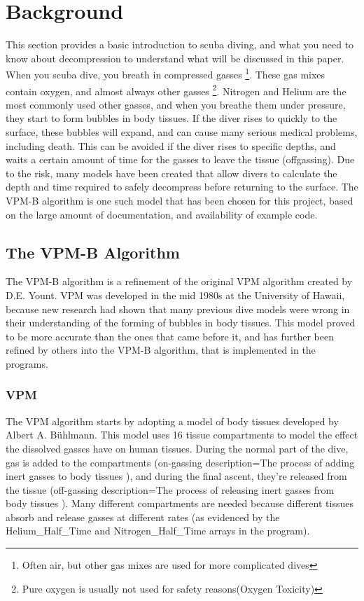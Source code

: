 \documentclass[12pt]{article}
\begin{document}
\section{Background}

This section provides a basic introduction to scuba diving, and what you need to know about decompression to
 understand what will be discussed in this paper. 
When you scuba dive, you breath in compressed gasses \footnote{Often air, but other gas mixes are used
for more complicated dives}. These gas mixes contain oxygen, and almost always other gasses \footnote{Pure oxygen
is usually not used for safety reasons(Oxygen Toxicity)}. Nitrogen and Helium are the most commonly used
other gasses, and when you breathe them under pressure, they start to form bubbles in body tissues. If the diver rises to quickly to the surface, these bubbles will expand, and can cause many serious medical problems, including death. This can
be avoided if the diver rises to specific depths, and waits a certain amount of time for the gasses to leave the
tissue (offgassing). Due to the risk, many models have been created that allow divers to calculate the depth and
time required to safely decompress before returning to the surface. The VPM-B algorithm is one such model that
has been chosen for this project, based on the large amount of documentation, and availability of example code.

\subsection{The VPM-B Algorithm}

 The VPM-B algorithm is a refinement of the original VPM algorithm created by D.E. Yount. VPM was developed
in the mid 1980s at the University of Hawaii, because new research had shown that many previous dive models
were wrong in their understanding of the forming of bubbles in body tissues\cite{yount86}. This model
proved to be more accurate than the ones that came before it, and has further been refined by others
into the VPM-B algorithm, that is implemented in the programs.

\subsubsection{VPM}
 The VPM algorithm starts by adopting a model of body tissues developed by Albert A. B\"uhlmann. This model
uses 16 tissue compartments to model the effect the dissolved gasses have on human tissues. During the
normal part of the dive, gas is added to the compartments\cite{Buhlmann84} (on-gassing {description={The process of adding inert gasses to body tissues}}
), and during the final ascent,
they're released from the tissue (off-gassing { description={The process of releasing inert gasses from body tissues}}
). Many different compartments are needed because different
tissues absorb and release gasses at different rates (as evidenced by the Helium\_Half\_Time and
Nitrogen\_Half\_Time arrays in the program).
\end{document}
